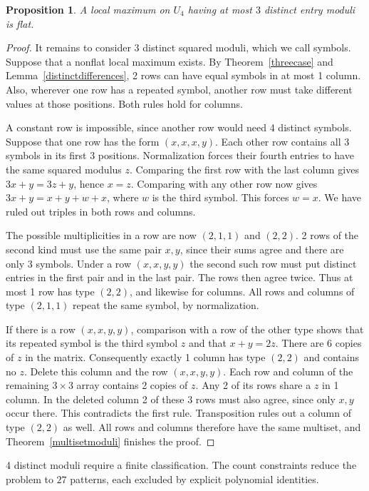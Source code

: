 \documentclass[11pt,a4paper]{article}
\newtheorem{prop}[thm]{Proposition}
\begin{document}
\begin{prop}\label{threemoduli}
A local maximum on $U_4$ having at most $3$ distinct entry moduli is
flat.
\end{prop}
\begin{proof}
It remains to consider 3 distinct squared moduli, which we call
symbols. Suppose that a nonflat local maximum exists. By
Theorem~\ref{threecase} and Lemma~\ref{distinctdifferences}, 2 rows
can have equal symbols in at most 1 column. Also, wherever one row has a repeated symbol,
another row must take different values at those positions. Both rules
hold for columns.

A constant row is impossible, since another row would need 4
distinct symbols. Suppose that one row has the form $(x,x,x,y)$.
Each other row contains all 3 symbols in its first 3 positions.
Normalization forces their fourth entries to have the same squared
modulus $z$. Comparing the first row with the last column gives
$3x+y=3z+y$, hence $x=z$. Comparing with any other row now gives
$3x+y=x+y+w+x$, where $w$ is the third symbol. This forces $w=x$.
We have ruled out triples in both rows and columns.

The possible multiplicities in a row are now $(2,1,1)$ and $(2,2)$.
2 rows of the second kind must use the same pair $x,y$, since their
sums agree and there are only 3 symbols. Under a row
$(x,x,y,y)$ the second such row must put distinct entries in the first
pair and in the last pair. The rows then agree twice. Thus at most 1
row has type $(2,2)$, and likewise for columns. All rows and columns
of type $(2,1,1)$ repeat the same symbol, by normalization.

If there is a row $(x,x,y,y)$, comparison with a row of the other type
shows that its repeated symbol is the third symbol $z$ and that
$x+y=2z$. There are 6 copies of $z$ in the matrix. Consequently
exactly 1 column has type $(2,2)$ and contains no $z$. Delete this
column and the row $(x,x,y,y)$. Each row and column of the remaining
$3\times3$ array contains 2 copies of $z$. Any 2 of its rows
share a $z$ in 1 column. In the deleted column 2 of these 3
rows must also agree, since only $x,y$ occur there. This contradicts
the first rule. Transposition rules out a column of type $(2,2)$ as
well. All rows and columns therefore have the same multiset, and
Theorem~\ref{multisetmoduli} finishes the proof.
\end{proof}

4 distinct moduli require a finite classification. The count
constraints reduce the problem to $27$ patterns, each excluded by
explicit polynomial identities.
\end{document}
